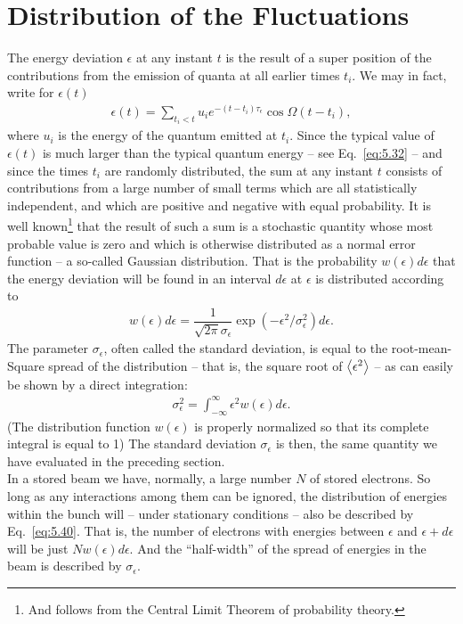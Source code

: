 \section{Distribution of the Fluctuations}\label{sec:5.3}

The energy deviation $\epsilon$ at any instant $t$ is the result of a super position of the
contributions from the emission of quanta at all earlier times $t_i$. We may in fact, write for $\epsilon(t)$
\begin{align} \label{eq:5.49}
	\epsilon(t) = \sum_{t_i<t} u_i e^{-(t-t_i)\tau_\epsilon}\cos\Omega(t-t_i),
\end{align}
where $u_i$ is the energy of the quantum emitted at $t_i$. Since the typical value of $\epsilon(t)$ is much larger than the typical quantum energy -- see Eq.~\eqref{eq:5.32} -- and since the times $t_i$ are randomly distributed, the sum at any instant $t$ consists of contributions from a large number of small terms which are all statistically independent, and which are positive and negative with equal probability. It is well known\footnote{And follows from the Central Limit Theorem of probability theory.} that the result of such a sum is a stochastic quantity whose most probable value is zero and which is otherwise distributed as a normal error function -- a so-called Gaussian distribution. That is the probability $w(\epsilon)d\epsilon$ that the energy deviation
will be found in an interval $d\epsilon$ at $\epsilon$ is distributed according to
\begin{align}\label{eq:5.50}
	w(\epsilon)d\epsilon = \dfrac{1}{\sqrt{2\pi}\sigma_\epsilon} \exp{(-\epsilon^2/\sigma_\epsilon^2)}d\epsilon.
\end{align}
The parameter $\sigma_\epsilon$, often called the standard deviation, is equal to the root-mean-
Square spread of the distribution -- that is, the square root of $\left< \epsilon^2 \right>$ -- as can
easily be shown by a direct integration:
\begin{align}
	\sigma_\epsilon^2 = \int_{-\infty}^{\infty} \epsilon^2 w(\epsilon) d\epsilon.
\end{align}
(The distribution function $w(\epsilon)$ is properly normalized so that its complete integral
is equal to 1) The standard deviation $\sigma_\epsilon$ is then, the same quantity we have evaluated in the preceding section.\\
In a stored beam we have, normally, a large number $N$ of stored electrons. So long as any interactions among them can be ignored, the distribution of energies within the bunch will -- under stationary conditions -- also be described by Eq.~\eqref{eq:5.40}. That is, the number of electrons with energies between $\epsilon$ and $\epsilon+d\epsilon$ will be just $Nw(\epsilon)d\epsilon$. And the ``half-width'' of the spread of energies in the beam is described by $\sigma_\epsilon$.\\
